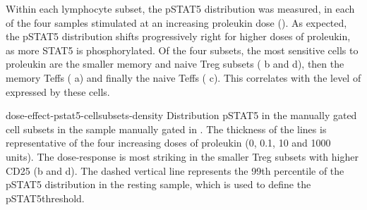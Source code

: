 Within each lymphocyte subset, the pSTAT5 distribution was measured, in each of the four samples stimulated at an increasing proleukin dose
().  
As expected, the pSTAT5 distribution shifts progressively right for higher doses of proleukin, as more STAT5 is phosphorylated.
Of the four subsets, the most sensitive cells to proleukin are the smaller memory and naive Treg subsets ( b and d),
then the memory Teffs ( a) and finally the naive Teffs ( c).
This correlates with the level of  expressed by these cells.

{dose-effect-pstat5-cellsubsets-density}
{ Distribution pSTAT5 in the manually gated cell subsets in the sample manually gated in . }
{
The thickness of the lines is representative of the four increasing doses of proleukin (0, 0.1, 10 and 1000 units).
The dose-response is most striking in the smaller Treg subsets with higher CD25 (b and d).
The dashed vertical line represents the 99th percentile of the pSTAT5 distribution in the resting sample,
which is used to define the pSTAT5\positive threshold.
}

